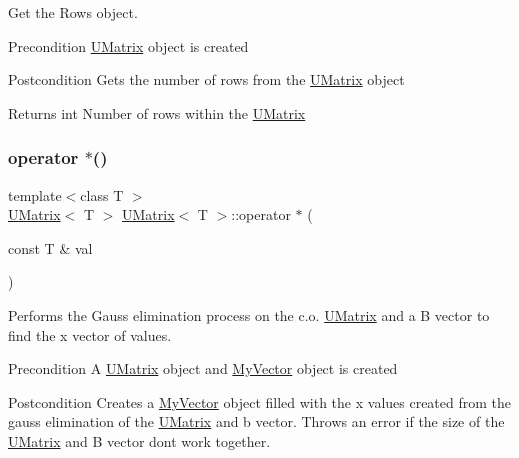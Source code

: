 Get the Rows object. 

\begin{DoxyPrecond}{Precondition}
\mbox{\hyperlink{class_u_matrix}{U\+Matrix}} object is created 
\end{DoxyPrecond}
\begin{DoxyPostcond}{Postcondition}
Gets the number of rows from the \mbox{\hyperlink{class_u_matrix}{U\+Matrix}} object 
\end{DoxyPostcond}
\begin{DoxyReturn}{Returns}
int Number of rows within the \mbox{\hyperlink{class_u_matrix}{U\+Matrix}} 
\end{DoxyReturn}
\mbox{\label{class_u_matrix_ac5ccad89b228c8e264c4c5638098cbb7}} 
\subsubsection{\texorpdfstring{operator $\ast$()}{operator *()}}
{\footnotesize\ttfamily template$<$class T $>$ \\
\mbox{\hyperlink{class_u_matrix}{U\+Matrix}}$<$ T $>$ \mbox{\hyperlink{class_u_matrix}{U\+Matrix}}$<$ T $>$\+::operator $\ast$ (\begin{DoxyParamCaption}\item[{const T \&}]{val }\end{DoxyParamCaption})}



Performs the Gauss elimination process on the c.\+o. \mbox{\hyperlink{class_u_matrix}{U\+Matrix}} and a B vector to find the x vector of values. 

\begin{DoxyPrecond}{Precondition}
A \mbox{\hyperlink{class_u_matrix}{U\+Matrix}} object and \mbox{\hyperlink{class_my_vector}{My\+Vector}} object is created 
\end{DoxyPrecond}
\begin{DoxyPostcond}{Postcondition}
Creates a \mbox{\hyperlink{class_my_vector}{My\+Vector}} object filled with the x values created from the gauss elimination of the \mbox{\hyperlink{class_u_matrix}{U\+Matrix}} and b vector. Throws an error if the size of the \mbox{\hyperlink{class_u_matrix}{U\+Matrix}} and B vector don\textquotesingle{}t work together. 
\end{DoxyPostcond}

